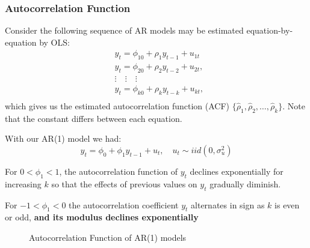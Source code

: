 \documentclass[11pt]{article}
\begin{document}
\subsubsection{Autocorrelation Function}

Consider the following sequence of AR models may be estimated equation-by-equation by OLS:
\begin{equation}
\begin{aligned}
& y_t=\phi_{10}+\rho_1 y_{t-1}+u_{1 t} \\
& y_t=\phi_{20}+\rho_2 y_{t-2}+u_{2 t} \text {, } \\
& \vdots \quad \vdots \quad \vdots \\
& y_t=\phi_{k 0}+\rho_k y_{t-k}+u_{k t}, \\
&
\end{aligned}
\end{equation}
which gives us the estimated autocorrelation function (ACF) $\{\hat{\rho}_1, \hat{\rho}_2, \ldots, \hat{\rho}_k\}$. Note that the constant differs between each equation.

With our AR(1) model we had:
\begin{equation}
y_t=\phi_0+\phi_1 y_{t-1}+u_t, \quad u_t \sim i i d\left(0, \sigma_u^2\right)
\end{equation}

For $0<\phi_1<1$, the autocorrelation function of $y_t$ declines exponentially for increasing $k$ so that the effects of previous values on $y_t$ gradually diminish.

For $-1<\phi_1<0$ the autocorrelation coefficient $y_t$ alternates in sign as $k$ is even or odd, \textbf{and its modulus declines exponentially}

\begin{figure}[h]
    \centering
    \qquad
    \caption{Autocorrelation Function of AR(1) models}%
    \label{fig:positive negative acf}%
\end{figure}
\end{document}
